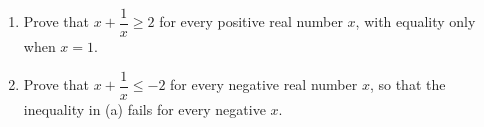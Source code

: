 \begin{enumerate}
\item[(a)] Prove that $x+\dfrac1x\ge2$ for every positive real number $x$, with equality only when $x=1$.
\item[(b)] Prove that $x+\dfrac1x\le-2$ for every negative real number $x$, so that the inequality in (a) fails for every negative $x$.
\end{enumerate}
